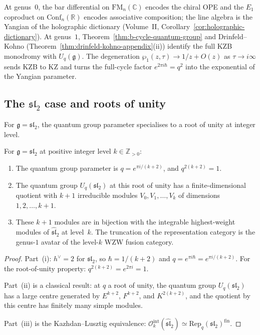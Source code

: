\begin{remark}
At genus~$0$, the bar differential on $\mathrm{FM}_n(\mathbb{C})$
encodes the chiral OPE and the $E_1$ coproduct on
$\mathrm{Conf}_n(\mathbb{R})$ encodes associative composition; the
line algebra is the Yangian of the holographic dictionary
\textup{(}Volume~II, Corollary~\ref*{cor:holographic-dictionary}\textup{)}.
At genus~$1$, Theorem~\ref{thm:b-cycle-quantum-group} and
Drinfeld--Kohno \textup{(}Theorem~\ref{thm:drinfeld-kohno-appendix}(ii)\textup{)}
identify the full KZB monodromy with $U_q(\mathfrak{g})$.
The degeneration $\wp_1(z,\tau)\to 1/z+O(z)$ as
$\tau\to i\infty$ sends KZB to KZ and turns the full-cycle factor
$e^{2\pi i\hbar}=q^2$ into the exponential of the Yangian parameter.
\end{remark}

\subsection{The $\mathfrak{sl}_2$ case and roots of unity}
\label{sec:sl2-roots-unity}

For $\mathfrak{g} = \mathfrak{sl}_2$, the quantum group parameter
specialises to a root of unity at integer level.

\begin{corollary}
\label{cor:sl2-root-of-unity}
For $\mathfrak{g} = \mathfrak{sl}_2$ at positive integer level
$k \in \mathbb{Z}_{>0}$:
\begin{enumerate}[label=\textup{(\roman*)}]
\item The quantum group parameter is
 $q = e^{\pi i/(k+2)}$, and
 $q^{2(k+2)} = 1$.
\item The quantum group $U_q(\mathfrak{sl}_2)$ at this root of
 unity has a finite-dimensional quotient with $k+1$ irreducible
 modules $V_0, V_1, \dots, V_k$ of dimensions $1, 2, \dots, k+1$.
\item These $k+1$ modules are in bijection with the integrable
 highest-weight modules of $\widehat{\mathfrak{sl}}_2$ at level~$k$.
 The truncation of the representation category is the genus-$1$
 avatar of the level-$k$ WZW fusion category.
\end{enumerate}
\end{corollary}

\begin{proof}
Part~(i): $h^\vee = 2$ for $\mathfrak{sl}_2$, so
$\hbar = 1/(k+2)$ and $q = e^{\pi i \hbar} = e^{\pi i/(k+2)}$.
For the root-of-unity property:
$q^{2(k+2)} = e^{2\pi i} = 1$.

Part~(ii) is a classical result: at $q$ a root of unity, the
quantum group $U_q(\mathfrak{sl}_2)$ has a large centre generated
by $E^{k+2}$, $F^{k+2}$, and $K^{2(k+2)}$, and the quotient by
this centre has finitely many simple modules.

Part~(iii) is the Kazhdan--Lusztig equivalence:
$\mathcal{O}_k^{\mathrm{int}}(\widehat{\mathfrak{sl}}_2)
\simeq \mathrm{Rep}_q(\mathfrak{sl}_2)^{\mathrm{fin}}$.
\end{proof}

